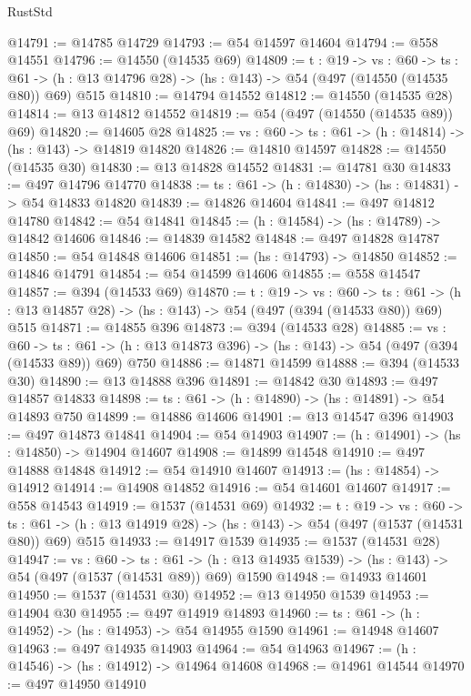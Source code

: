 \begin{lexlean}{RustStd}
\begin{coremodule}
@14791 := @14785 @14729
@14793 := @54 @14597 @14604
@14794 := @558 @14551
@14796 := @14550 (@14535 @69)
@14809 := {t : @19} ->
  {vs : @60} ->
  {ts : @61} -> (h : @13 @14796 @28) -> (hs : @143) -> @54 (@497 (@14550 (@14535 @80)) @69) @515
@14810 := @14794 @14552
@14812 := @14550 (@14535 @28)
@14814 := @13 @14812 @14552
@14819 := @54 (@497 (@14550 (@14535 @89)) @69)
@14820 := @14605 @28
@14825 := {vs : @60} -> {ts : @61} -> (h : @14814) -> (hs : @143) -> @14819 @14820
@14826 := @14810 @14597
@14828 := @14550 (@14535 @30)
@14830 := @13 @14828 @14552
@14831 := @14781 @30
@14833 := @497 @14796 @14770
@14838 := {ts : @61} -> (h : @14830) -> (hs : @14831) -> @54 @14833 @14820
@14839 := @14826 @14604
@14841 := @497 @14812 @14780
@14842 := @54 @14841
@14845 := (h : @14584) -> (hs : @14789) -> @14842 @14606
@14846 := @14839 @14582
@14848 := @497 @14828 @14787
@14850 := @54 @14848 @14606
@14851 := (hs : @14793) -> @14850
@14852 := @14846 @14791
@14854 := @54 @14599 @14606
@14855 := @558 @14547
@14857 := @394 (@14533 @69)
@14870 := {t : @19} ->
  {vs : @60} ->
  {ts : @61} -> (h : @13 @14857 @28) -> (hs : @143) -> @54 (@497 (@394 (@14533 @80)) @69) @515
@14871 := @14855 @396
@14873 := @394 (@14533 @28)
@14885 := {vs : @60} ->
  {ts : @61} -> (h : @13 @14873 @396) -> (hs : @143) -> @54 (@497 (@394 (@14533 @89)) @69) @750
@14886 := @14871 @14599
@14888 := @394 (@14533 @30)
@14890 := @13 @14888 @396
@14891 := @14842 @30
@14893 := @497 @14857 @14833
@14898 := {ts : @61} -> (h : @14890) -> (hs : @14891) -> @54 @14893 @750
@14899 := @14886 @14606
@14901 := @13 @14547 @396
@14903 := @497 @14873 @14841
@14904 := @54 @14903
@14907 := (h : @14901) -> (hs : @14850) -> @14904 @14607
@14908 := @14899 @14548
@14910 := @497 @14888 @14848
@14912 := @54 @14910 @14607
@14913 := (hs : @14854) -> @14912
@14914 := @14908 @14852
@14916 := @54 @14601 @14607
@14917 := @558 @14543
@14919 := @1537 (@14531 @69)
@14932 := {t : @19} ->
  {vs : @60} ->
  {ts : @61} -> (h : @13 @14919 @28) -> (hs : @143) -> @54 (@497 (@1537 (@14531 @80)) @69) @515
@14933 := @14917 @1539
@14935 := @1537 (@14531 @28)
@14947 := {vs : @60} ->
  {ts : @61} -> (h : @13 @14935 @1539) -> (hs : @143) -> @54 (@497 (@1537 (@14531 @89)) @69) @1590
@14948 := @14933 @14601
@14950 := @1537 (@14531 @30)
@14952 := @13 @14950 @1539
@14953 := @14904 @30
@14955 := @497 @14919 @14893
@14960 := {ts : @61} -> (h : @14952) -> (hs : @14953) -> @54 @14955 @1590
@14961 := @14948 @14607
@14963 := @497 @14935 @14903
@14964 := @54 @14963
@14967 := (h : @14546) -> (hs : @14912) -> @14964 @14608
@14968 := @14961 @14544
@14970 := @497 @14950 @14910

\end{coremodule}
\end{lexlean}
